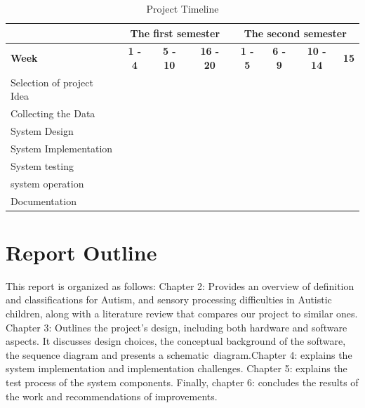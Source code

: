 \documentclass[a4paper,12pt]{report}
\begin{document}
\begin{table}[h]
\centering
\caption{Project Timeline}
\vspace{0.5em}
\renewcommand{\arraystretch}{1.3}

\begin{tabular}{|l|c|c|c|c|c|c|c|}
\hline
\multicolumn{1}{|c|}{} &
\multicolumn{3}{c|}{\textbf{The first semester}} &
\multicolumn{4}{c|}{\textbf{The second semester}} \\
\hline

\textbf{Week} &
\textbf{1 - 4} & \textbf{5 - 10} & \textbf{16 - 20} &
\textbf{1 - 5} & \textbf{6 - 9} & \textbf{10 - 14} & \textbf{15} \\
\hline

Selection of project Idea
& \cellcolor{gray!30} &  &  &  &  &  &  \\
\hline

Collecting the Data
&  & \cellcolor{gray!30} & \cellcolor{gray!30} &  &  &  &  \\
\hline

System Design
&  &  & \cellcolor{gray!30} & \cellcolor{gray!30} &  &  &  \\
\hline

System Implementation
&  &  &  & \cellcolor{gray!30} & \cellcolor{gray!30} & \cellcolor{gray!30} &  \\
\hline

System testing
&  &  &  &  & \cellcolor{gray!30} & \cellcolor{gray!30} & \cellcolor{gray!30} \\
\hline

system operation
&  &  &  &  &  & \cellcolor{gray!30} & \cellcolor{gray!30} \\
\hline

Documentation
&  & \cellcolor{gray!30} & \cellcolor{gray!30} &
\cellcolor{gray!30} & \cellcolor{gray!30} & \cellcolor{gray!30} & \cellcolor{gray!30} \\
\hline

\end{tabular}
\label{tab:timeline}
\end{table}


\section{Report Outline}

This report is organized as follows: Chapter 2: Provides an overview of definition and classifications for Autism, and sensory processing difficulties in Autistic children, along with a literature review that compares our project to similar ones. Chapter 3: Outlines the project’s design, including both hardware and software aspects. It discusses design choices, the conceptual background of the software, the sequence diagram and presents a schematic diagram.Chapter 4: explains the system implementation and implementation challenges. Chapter 5: explains the test process of the system components. Finally, chapter 6: concludes the results of the work and recommendations of improvements. 
\end{document}
